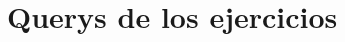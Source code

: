 \documentclass[a4paper,onecolumn]{article}
\let\stdsection\section
\renewcommand\section{\newpage\stdsection}
\begin{document}
\begin{sloppypar}
\begin{enumerate}
\begin{figure}[H]
\begin{subfigure}[b]{0.4\textwidth}
        \end{subfigure}
   \end{figure}
\end{enumerate}

\end{sloppypar}

\section{Querys de los ejercicios}

\end{document}
